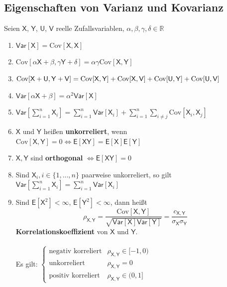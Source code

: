 \documentclass[a4paper,twocolumn,10pt]{article}
\newenvironment{iii}{\begin{enumerate}[label={\roman{*})}]}{\end{enumerate}}
\newcommand{\var}{\mathsf{Var}}
\newcommand{\erw}{\mathsf{E}}
\begin{document}
\subsection{Eigenschaften von Varianz und Kovarianz}
Seien $\mathsf X$, $\mathsf Y$, $\mathsf U$, $\mathsf V$ reelle Zufallsvariablen, $\alpha, \beta, \gamma, \delta \in \mathbb R$
\begin{iii}
\item $\var[\mathsf X] = \text{Cov}[\mathsf X, \mathsf X]$
\item $\text{Cov}[\alpha\mathsf X + \beta, \gamma\mathsf Y + \delta] = \alpha\gamma\text{Cov}[\mathsf X, \mathsf Y]$
\item $\text{Cov}[\mathsf X + \mathsf U, \mathsf Y + \mathsf V] \\= \text{Cov}[\mathsf X, \mathsf Y] + \text{Cov}[\mathsf X, \mathsf V] + \text{Cov}[\mathsf U, \mathsf Y] + \text{Cov}[\mathsf U, \mathsf V]$
\item $\var[\alpha\mathsf X + \beta] = \alpha^2\var[\mathsf X]$
\item $\var\left[\sum\limits_{i=1}^n\mathsf X_i\right] = \sum\limits_{i=1}^n\var[\mathsf X_i] + \sum\limits_{i=1}^n\sum\limits_{i \neq j}\text{Cov}[\mathsf X_i, \mathsf X_j]$
\item $\mathsf X$ und $\mathsf Y$ heißen \textbf{unkorreliert}, wenn\\$\text{Cov}[\mathsf X, \mathsf Y] = 0 \Leftrightarrow \erw[\mathsf X \mathsf Y] = \erw[\mathsf X]\erw[\mathsf Y]$
\item $\mathsf X,\mathsf Y$ sind \textbf{orthogonal} $\Leftrightarrow\erw[\mathsf X \mathsf Y] = 0$
\item Sind $\mathsf X_i, i \in \{1,\dots,n\}$ paarweise unkorreliert, so gilt\\$\var\left[\sum\limits_{i=1}^n\mathsf X_i\right] = \sum\limits_{i=1}^n\var[\mathsf X_i]$
\item Sind $\erw[\mathsf X^2] < \infty$, $\erw[\mathsf Y^2] < \infty$, dann heißt \[\rho_{\mathsf X, \mathsf Y} = \frac{\text{Cov}[\mathsf X, \mathsf Y]}{\sqrt{\var[\mathsf X]\var[\mathsf Y]}} = \frac{c_{\mathsf X, \mathsf Y}}{\sigma_\mathsf X\sigma_\mathsf Y}\] \textbf{Korrelationskoeffizient} von $\mathsf X$ und $\mathsf Y$.\\\\
Es gilt: $\begin{cases}\text{negativ korreliert} & \rho_{\mathsf{X,Y}}\in [-1,0) \\ \text{unkorreliert} & \rho_{\mathsf{X,Y}}=0 \\ \text{positiv korreliert} & \rho_{\mathsf{X,Y}}\in (0,1]\end{cases}$
\end{iii}
\end{document}
